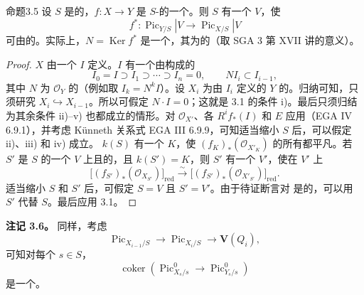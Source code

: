 \begin{SGAresult}{命题}{3.5}
设 $S$ 是的，$f:X\to Y$ 是 $S$-的一个。则 $S$ 有一个 $V$，使
\[
f^*:\operatorname{Pic}_{Y/S}|V\longrightarrow\operatorname{Pic}_{X/S}|V
\]
可由的。实际上，$N=\operatorname{Ker}f^*$ 是一个，其为的（取 SGA 3 第 XVII 讲的意义）。
\end{SGAresult}
\begin{proof}
$X$ 由一个 $I$ 定义。$I$ 有一个由构成的
\[
I_0=I\supset I_1\supset\cdots\supset I_n=0,
\qquad NI_i\subset I_{i-1},
\]
其中 $N$ 为 $\mathcal O_Y$ 的（例如取 $I_k=N^kI$）。设 $X_i$ 为由 $I_i$ 定义的 $Y$ 的。归纳可知，只须研究 $X_i\hookrightarrow X_{i-1}$。所以可假定 $N\cdot I=0$；这就是 3.1 的条件 i)。最后只须归结为其余条件 ii)--v) 也都成立的情形。对 $\mathcal O_{X'}$、各 $R^if_*(I)$ 和 $E$ 应用（EGA IV 6.9.1），并考虑 Künneth 关系式 EGA III 6.9.9，可知适当缩小 $S$ 后，可以假定 ii)、iii) 和 iv) 成立。
$k(S)$ 有一个 $K$，使 $(f_K)_*(\mathcal O_{X'_K})$ 的所有都平凡。若 $S'$ 是 $S$ 的一个 $V$ 上且的，且 $k(S')=K$，则 $S'$ 有一个 $V'$，使在 $V'$ 上
\[
\bigl[(f_{S'})_*(\mathcal O_{X_{S'}})\bigr]_{\mathrm{red}}
\xrightarrow\sim
\bigl[(f_{S'})_*(\mathcal O_{X'_{S'}})\bigr]_{\mathrm{red}}.
\]
适当缩小 $S$ 和 $S'$ 后，可假定 $S=V$ 且 $S'=V'$。由于待证断言对 是的，可以用 $S'$ 代替 $S$。最后应用 3.1。
\end{proof}

\textbf{注记 3.6。} 同样，考虑
\[
\operatorname{Pic}_{X_{i-1}/S}\longrightarrow\operatorname{Pic}_{X_i/S}\longrightarrow\mathbf V(Q_i),
\]
可知对每个 $s\in S$，
\[
\operatorname{coker}\left(\operatorname{Pic}_{X_s/s}^{0}\longrightarrow\operatorname{Pic}_{Y_s/s}^{0}\right)
\]
是一个。

